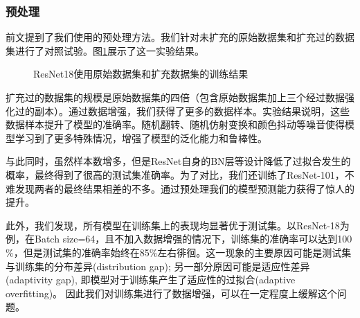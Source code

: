 \documentclass{article}
\theoremstyle{definition}
\begin{document}
\subsubsection{预处理}
前文提到了我们使用的预处理方法。我们针对未扩充的原始数据集和扩充过的数据集进行了对照试验。图\ref{fig:resnet18_amp}展示了这一实验结果。
\begin{figure}[H]
	\centering
	\caption{ResNet18使用原始数据集和扩充数据集的训练结果}
	\label{fig:resnet18_amp}
\end{figure}
扩充过的数据集的规模是原始数据集的四倍（包含原始数据集加上三个经过数据强化过的副本）。通过数据增强，我们获得了更多的数据样本。实验结果说明，这些数据样本提升了模型的准确率。随机翻转、随机仿射变换和颜色抖动等噪音使得模型学习到了更多特殊情况，增强了模型的泛化能力和鲁棒性。

与此同时，虽然样本数增多，但是ResNet自身的BN层等设计降低了过拟合发生的概率，最终得到了很高的测试集准确率。为了对比，我们还训练了ResNet-101，不难发现两者的最终结果相差的不多。通过预处理我们的模型预测能力获得了惊人的提升。

此外，我们发现，所有模型在训练集上的表现均显著优于测试集。以ResNet-18为例，在Batch size=64，且不加入数据增强的情况下，训练集的准确率可以达到100$\%$，但是测试集的准确率始终在85$\%$左右徘徊。这一现象的主要原因可能是测试集与训练集的分布差异(distribution gap); 另一部分原因可能是适应性差异(adaptivity gap), 即模型对于训练集产生了适应性的过拟合(adaptive overfitting)。\cite{cifar2018} 因此我们对训练集进行了数据增强，可以在一定程度上缓解这个问题。
\end{document}
